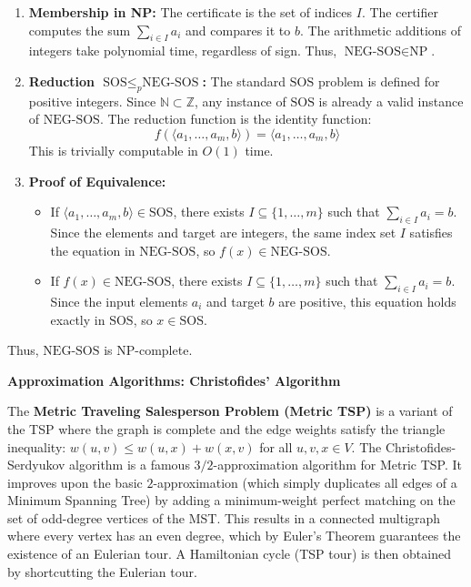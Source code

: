 \documentclass[12pt,addpoints]{exam}
\begin{document}
\begin{questions}
\begin{parts}
\begin{solution}
\begin{enumerate}
    \item \textbf{Membership in NP:} The certificate is the set of indices $I$. The certifier computes the sum $\sum_{i \in I} a_i$ and compares it to $b$. The arithmetic additions of integers take polynomial time, regardless of sign. Thus, $\text{NEG-SOS} \in \text{NP}$.
    \item \textbf{Reduction $\text{SOS} \le_p \text{NEG-SOS}$:}
    The standard $\text{SOS}$ problem is defined for positive integers. Since $\mathbb{N} \subset \mathbb{Z}$, any instance of $\text{SOS}$ is already a valid instance of $\text{NEG-SOS}$. The reduction function is the identity function:
    $$f(\langle a_1, \dots, a_m, b \rangle) = \langle a_1, \dots, a_m, b \rangle$$
    This is trivially computable in $O(1)$ time.
    \item \textbf{Proof of Equivalence:}
    \begin{itemize}
        \item If $\langle a_1, \dots, a_m, b \rangle \in \text{SOS}$, there exists $I \subseteq \{1, \dots, m\}$ such that $\sum_{i \in I} a_i = b$. Since the elements and target are integers, the same index set $I$ satisfies the equation in $\text{NEG-SOS}$, so $f(x) \in \text{NEG-SOS}$.
        \item If $f(x) \in \text{NEG-SOS}$, there exists $I \subseteq \{1, \dots, m\}$ such that $\sum_{i \in I} a_i = b$. Since the input elements $a_i$ and target $b$ are positive, this equation holds exactly in $\text{SOS}$, so $x \in \text{SOS}$.
    \end{itemize}
\end{enumerate}
Thus, $\text{NEG-SOS}$ is $\text{NP}$-complete.
\end{solution}
\end{parts}

\question[15] \textbf{Approximation Algorithms: Christofides' Algorithm}

The \textbf{Metric Traveling Salesperson Problem (Metric TSP)} is a variant of the TSP where the graph is complete and the edge weights satisfy the triangle inequality: $w(u,v) \le w(u,x) + w(x,v)$ for all $u, v, x \in V$.
The Christofides-Serdyukov algorithm is a famous $3/2$-approximation algorithm for Metric TSP. It improves upon the basic $2$-approximation (which simply duplicates all edges of a Minimum Spanning Tree) by adding a minimum-weight perfect matching on the set of odd-degree vertices of the MST. This results in a connected multigraph where every vertex has an even degree, which by Euler's Theorem guarantees the existence of an Eulerian tour. A Hamiltonian cycle (TSP tour) is then obtained by shortcutting the Eulerian tour.


\end{questions}
\end{document}
